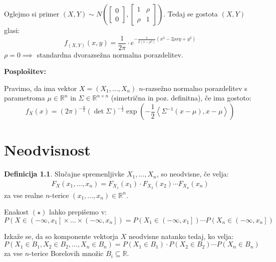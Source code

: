 \documentclass[12pt]{book}
\def\n{\noindent}
\theoremstyle{definition}
\newtheorem{definicija}{Definicija}
\theoremstyle{plain}
\theoremstyle{plain}
\theoremstyle{plain}
\theoremstyle{plain}
\theoremstyle{remark}
\begin{document}
\begin{zgled}
    Oglejmo si primer $(X,Y) \sim N\left(\begin{bmatrix} 0 \\ 0 \end{bmatrix},\begin{bmatrix} 1 & \rho \\ \rho & 1 \end{bmatrix}\right)$. Tedaj se gostota $(X, Y)$ glasi:
    $$
    f_{(X, Y)}(x, y)=\frac{1}{2 \pi} \cdot e^{-\frac{1}{2\left(1-\rho^2\right)}\left(x^2-2 \rho x y+y^2\right)}
    $$
    $\rho = 0 \implies$ standardna dvorazsežna normalna porazdelitev.
\end{zgled}

\n \textbf{Posplošitev:}

\n Pravimo, da ima vektor $X=\left(X_1, \ldots, X_n\right)$ $n$-razsežno normalno porazdelitev s parametroma $\mu \in \mathbb{R}^n$ in $\Sigma \in \mathbb{R}^{n \times n}$ (simetrična in poz. definitna), če ima gostoto: 
$$
f_{X}(x)=(2 \pi)^{-\frac{n}{2}}(\det \Sigma)^{-\frac{1}{2}} \exp\left(-\frac{1}{2}\left\langle\Sigma^{-1}(x-\mu), x-\mu\right\rangle\right)
$$

\chapter{Neodvisnost}

\begin{definicija}
    Slučajne spremenljivke $X_1, \ldots, X_n$, so neodvisne, če velja: 
    \begin{align*}
        F_{X}\left(x_1, \ldots, x_n\right)=F_{X_1}\left(x_1\right) \cdot F_{X_2}\left(x_2\right) \cdots F_{X_n}\left(x_n\right) \tag{$\star$} 
    \end{align*}
    za vse realne $n$-terice $\left(x_1, \ldots, x_n\right) \in \mathbb{R}^n$.
\end{definicija}

\n Enakost $(\star)$ lahko prepišemo v: 
$$
P\left(X \in\left(-\infty, x_1\right] \times \ldots \times\left(-\infty, x_n\right]\right)=P\left(X_1 \in\left(-\infty, x_1\right]\right) \cdots  P\left(X_n \in\left(-\infty, x_n\right]\right)
$$

\n Izkaže se, da so komponente vektorja $X$ neodvisne natanko tedaj, ko velja:
$$
P\left(X_1 \in B_1, X_2 \in B_2, \ldots, X_n \in B_n\right)=P\left(X_1 \in B_1\right) \cdot P\left(X_2 \in B_2\right) \cdots P\left(X_n \in B_n\right)
$$
za vse $n$-terice Borelovih množic $B_i \subseteq \mathbb{R}$.
\end{document}
